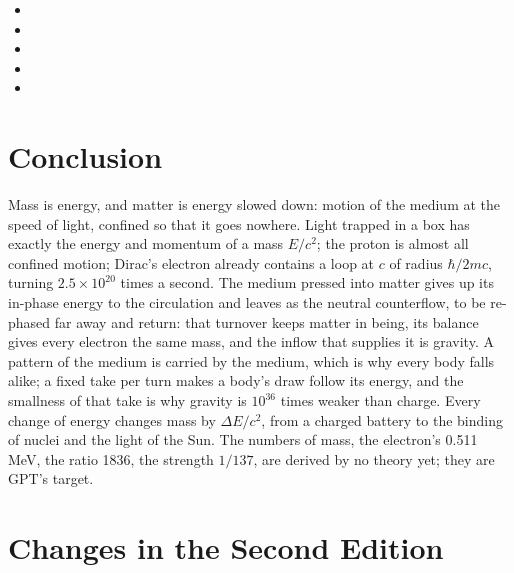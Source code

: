 \documentclass[11pt,a4paper]{article}
\begin{document}
\begin{itemize}
\item {}
\item {}
\item {}
\item {}
\item {}
\end{itemize}

\section*{Conclusion}

Mass is energy, and matter is energy slowed down: motion of the medium at the speed of light, confined so that it goes nowhere. Light trapped in a box has exactly the energy and momentum of a mass $E/c^2$; the proton is almost all confined motion; Dirac's electron already contains a loop at $c$ of radius $\hbar/2mc$, turning $2.5\times10^{20}$ times a second. The medium pressed into matter gives up its in-phase energy to the circulation and leaves as the neutral counterflow, to be re-phased far away and return: that turnover keeps matter in being, its balance gives every electron the same mass, and the inflow that supplies it is gravity. A pattern of the medium is carried by the medium, which is why every body falls alike; a fixed take per turn makes a body's draw follow its energy, and the smallness of that take is why gravity is $10^{36}$ times weaker than charge. Every change of energy changes mass by $\Delta E/c^2$, from a charged battery to the binding of nuclei and the light of the Sun. The numbers of mass, the electron's 0.511 MeV, the ratio 1836, the strength $1/137$, are derived by no theory yet; they are GPT's target.

\clearpage
\section*{Changes in the Second Edition}
\end{document}
